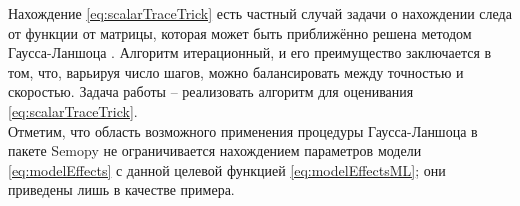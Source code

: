 Нахождение \eqref{eq:scalarTraceTrick} есть частный случай задачи о нахождении следа от функции от матрицы, которая может быть приближённо решена методом Гаусса-Ланшоца \cite{golub2010matMomentsQuadr, golub2013matcomput, ubaru2017fast}.
Алгоритм итерационный, и его преимущество заключается в том, что, варьируя число шагов, можно балансировать между точностью и скоростью.
Задача работы -- реализовать алгоритм для оценивания \eqref{eq:scalarTraceTrick}. \\

Отметим, что область возможного применения процедуры Гаусса-Ланшоца в пакете Semopy не ограничивается нахождением параметров модели \eqref{eq:modelEffects} с данной целевой функцией \eqref{eq:modelEffectsML}; они приведены лишь в качестве примера.